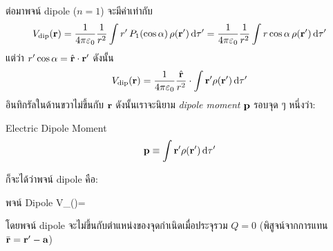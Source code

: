 ต่อมาพจน์ dipole ($n=1$) จะมีค่าเท่ากับ
\[
V_\txt{dip}(\vb{r})=\kem\frac{1}{r^2}\int r'\,P_1(\cos\alpha)\,\rho(\vb{r}')\odif{\tau'}=\kem\frac{1}{r^2}\int r\cos\alpha\,\rho(\vb{r}')\odif{\tau'}
\]
แต่ว่า $r'\cos\alpha=\hat{\mathbf{r}}\cdot\mathbf{r}'$ ดังนั้น
\[
V_\txt{dip}(\vb{r})=\kem\frac{\vu{r}}{r^2}\cdot\int\vb{r}'\rho(\vb{r}')\odif{\tau'}
\]
อินทิกรัลในด้านขวาไม่ขึ้นกับ $\mathbf{r}$ ดังนั้นเราจะนิยาม \emph{dipole moment} $\mathbf{p}$ รอบจุด ๆ หนึ่งว่า:
\begin{defbox}{ Electric Dipole Moment}
    \begin{equation}
        \vb{p}\equiv\int\vb{r}'\rho(\vb{r}')\odif{\tau'}
    \end{equation}
\end{defbox}
ก็จะได้ว่าพจน์ dipole คือ:
\begin{eqbox}{พจน์ Dipole}
    V_()=\kem{}\label{dippotential}
\end{eqbox}
โดยพจน์ dipole จะไม่ขึ้นกับตำแหน่งของจุดกำเนิดเมื่อประจุรวม $Q=0$ (พิสูจน์จากการแทน $\bar{\mathbf{r}}=\mathbf{r}'-\mathbf{a}$)

